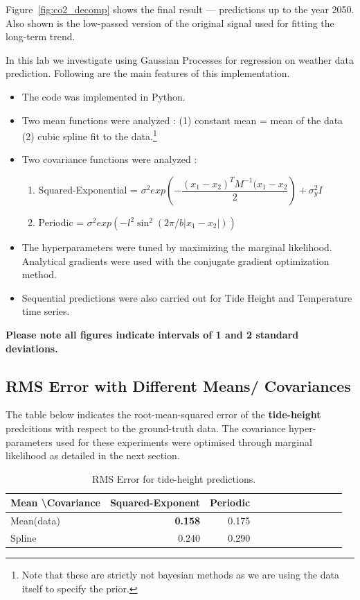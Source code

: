 \documentclass[11pt]{report}
\begin{document}
Figure~\ref{fig:co2_decomp} shows the final result --- predictions up to the year 2050. Also shown is the low-passed version of the original signal used for fitting the long-term trend.
\clearpage



In this lab we investigate using Gaussian Processes for regression on weather data prediction. Following are the main features of this implementation.
\begin{itemize}
    \item The code was implemented in Python.
    \item Two mean functions were analyzed : (1) constant mean = mean of the data (2) cubic spline fit to the data.\footnote{ Note that these are strictly not bayesian methods as we are using the data itself to specify the prior.}
    \item Two covariance functions were analyzed :
        \begin{enumerate}
        \item Squared-Exponential = $\sigma^2 exp\left(-\dfrac{(x_1-x_2)^TM^{-1}(x_1-x_2}{2}\right) + \sigma_y^2I$
        \item Periodic  = $\sigma^2 exp\left(-l^2\sin^2(2\pi/b|x_1-x_2|)\right)$
        \end{enumerate}
        \item The hyperparameters were tuned by maximizing the marginal likelihood. Analytical gradients were used with the conjugate gradient optimization method.
        \item Sequential predictions were also carried out for Tide Height and Temperature time series.
\end{itemize}
\textbf{Please note all figures indicate intervals of 1 and 2 standard deviations.}
\subsection*{RMS Error with Different Means/ Covariances}
The table below indicates the root-mean-squared error of the \textbf{tide-height} predcitions with respect to the ground-truth data. The covariance hyper-parameters used for these experiments were optimised through marginal likelihood as detailed in the next section.

\begin{table}[h]
\begin{center}
\begin{tabular}{|l||r|r|r|r|r|r|r|r|r|r|r|}
\hline
Mean \textbackslash Covariance & Squared-Exponent & Periodic\\\hline\hline
Mean(data) & \textbf{0.158} &   0.175 \\\hline
Spline     & 0.240 &   0.290 \\\hline
\end{tabular}
\caption{RMS Error for tide-height predictions.}
\label{tab1}
\end{center}
\end{table}
\end{document}
